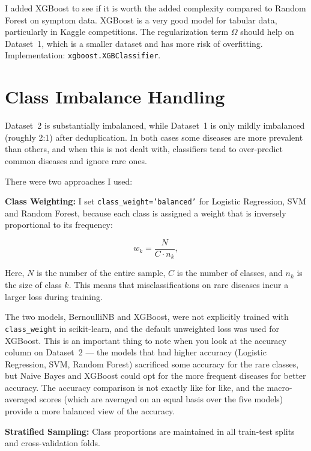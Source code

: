I added XGBoost to see if it is worth the added complexity compared to Random Forest on symptom data. XGBoost is a very good model for tabular data, particularly in Kaggle competitions. The regularization term $\Omega$ should help on Dataset~1, which is a smaller dataset and has more risk of overfitting. Implementation: \texttt{xgboost.XGBClassifier}.

\section{Class Imbalance Handling}
\label{sec:class_imbalance}

Dataset~2 is substantially imbalanced, while Dataset~1 is only mildly imbalanced (roughly 2:1) after deduplication. In both cases some diseases are more prevalent than others, and when this is not dealt with, classifiers tend to over-predict common diseases and ignore rare ones.

There were two approaches I used:

\textbf{Class Weighting:} I set \texttt{class\_weight='balanced'} for Logistic Regression, SVM and Random Forest, because each class is assigned a weight that is inversely proportional to its frequency:

\begin{equation}
\label{eq:class_weight}
w_k = \frac{N}{C \cdot n_k},
\end{equation}

\noindent Here, $N$ is the number of the entire sample, $C$ is the number of classes, and $n_k$ is the size of class $k$. This means that misclassifications on rare diseases incur a larger loss during training.

The two models, BernoulliNB and XGBoost, were not explicitly trained with \texttt{class\_weight} in scikit-learn, and the default unweighted loss was used for XGBoost. This is an important thing to note when you look at the accuracy column on Dataset~2 --- the models that had higher accuracy (Logistic Regression, SVM, Random Forest) sacrificed some accuracy for the rare classes, but Naive Bayes and XGBoost could opt for the more frequent diseases for better accuracy. The accuracy comparison is not exactly like for like, and the macro-averaged scores (which are averaged on an equal basis over the five models) provide a more balanced view of the accuracy.

\textbf{Stratified Sampling:} Class proportions are maintained in all train-test splits and cross-validation folds.


